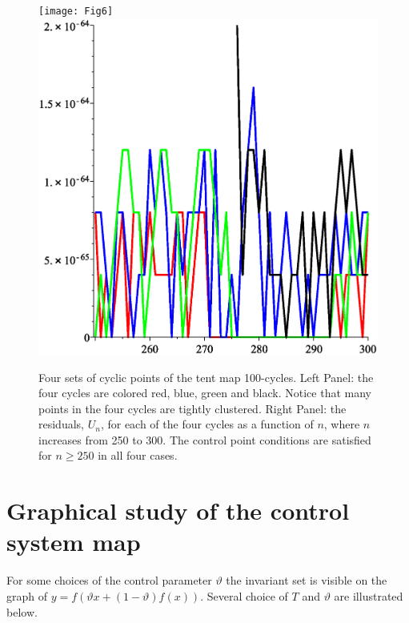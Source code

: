 \documentclass[12pt,a4paper]{amsart}
\begin{document}
\begin{figure}[h!]
\centering
\texttt{[image: Fig6]}
\includegraphics[scale=0.28]{fig7}
\caption{Four sets of cyclic points of the tent map 100-cycles.  Left Panel: the four cycles are colored red, blue, green and black.  Notice that many points in the four cycles are tightly clustered.  Right Panel: the residuals, $U_n$, for each of the four cycles as a function of $n$, where $n$ increases from 250 to 300.  The control point conditions are satisfied for $n \ge 250$ in all four cases.  } \label{f6}
\end{figure}


\section{Graphical study of the control system map} \label{sec:GraphicalStudy}

For some choices of the control parameter $\vartheta$ the invariant set is visible on the graph of $y = f \left( \vartheta x + (1 - \vartheta)f(x) \right).$ Several choice of $T$ and $\vartheta$ are illustrated below.
\end{document}
